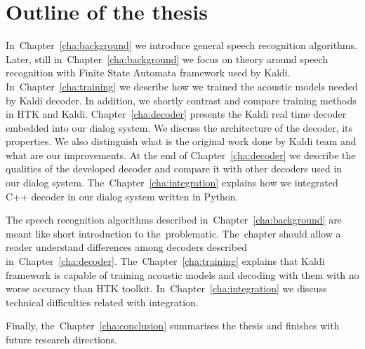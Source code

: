 \section{Outline of the thesis} 
\label{sec:outline_of_the_thesis}
In~Chapter~\ref{cha:background} we introduce general speech recognition algorithms. Later, still in~Chapter~\ref{cha:background} we focus on theory around speech recognition with Finite State Automata framework used by Kaldi. In~Chapter~\ref{cha:training} we describe how we trained the acoustic models needed by Kaldi decoder. In addition, we shortly contrast and compare training methods in HTK and Kaldi. Chapter~\ref{cha:decoder} presents the Kaldi real time decoder embedded into our dialog system. We discuss the architecture of the decoder, its properties. We also distinguish what is the original work done by Kaldi team and what are our improvements. At the end of Chapter~\ref{cha:decoder} we describe the qualities of the developed decoder and compare it with other decoders used in our dialog system.
The~Chapter~\ref{cha:integration} explains how we integrated C++ decoder in our dialog system written in Python.
    
The speech recognition algorithms described in~Chapter~\ref{cha:background} are meant like short introduction to the~problematic. The~chapter should allow a reader understand differences among decoders described in~Chapter~\ref{cha:decoder}. The~Chapter~\ref{cha:training} explains that Kaldi framework is capable of training acoustic models and decoding with them with no worse accuracy than HTK toolkit. In~Chapter~\ref{cha:integration} we discuss technical difficulties related with integration. 

Finally, the~Chapter~\ref{cha:conclusion} summarises the thesis and finishes with future research directions.

